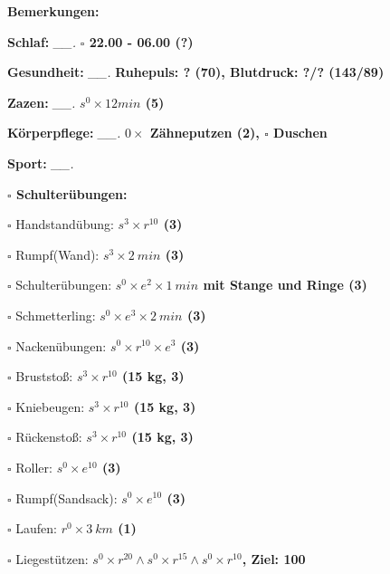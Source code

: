 \documentclass[10pt,a4paper]{article}
\newcommand\prop[1] {{\color {alizarin} {\bf #1}}}        %
\newcommand\mand[1] {{\color {burntorange} {\bf #1}}}     %
\newcommand\topspace{\vskip -15pt \hskip 20pt}
\newcommand\n[1] { {\sl #1.} \hskip 5pt }
\begin{document}
\begin{mdframed}[style=daystyle]
  \begin{labeling}{{\mand {Bemerkungen:}}}
    \setlength\itemsep{-3pt}
  \item[{\mand {Schlaf:}}]       \n{\_\_} {\prop {$\square$ 22.00 - 06.00 (?)}}
  \item[{\mand {Gesundheit:}}]   \n{\_\_} {\prop {Ruhepuls: ? (70), Blutdruck: ?/? (143/89)}}
  \item[{\mand {Zazen:}}]        \n{\_\_} {\prop {$s^0 \times 12 min$ (5)}}
  \item[{\mand {Körperpflege:}}] \n{\_\_} {\prop {$0 \times$ Zähneputzen (2), $\square$ Duschen}}
  \item[{\mand {Sport:}}]        \n{\_\_}
    \topspace
    \begin{minipage}{0.75\textwidth}  
      \begin{labeling}{\prop {$\square$ {Schulterübungen:}}} 
        \setlength\itemsep{-3pt}
      \item[$\square$ Handstandübung:]  {\prop {$s^3 \times r^{10}$ (3)}}
      \item[$\square$ Rumpf(Wand):]     {\prop {$s^3 \times 2\ min$ (3)}}
      \item[$\square$ Schulterübungen:] {\prop {$s^0 \times e^2 \times 1\ min$ mit Stange und Ringe (3)}}
      \item[$\square$ Schmetterling:]   {\prop {$s^0 \times e^3 \times 2\ min$ (3)}}
      \item[$\square$ Nackenübungen:]   {\prop {$s^0 \times r^{10} \times e^3$ (3)}}
      \item[$\square$ Bruststoß:]       {\prop {$s^3 \times r^{10}$ (15 kg, 3)}}
      \item[$\square$ Kniebeugen:]      {\prop {$s^3 \times r^{10}$ (15 kg, 3)}}
      \item[$\square$ Rückenstoß:]      {\prop {$s^3 \times r^{10}$ (15 kg, 3)}}
      \item[$\square$ Roller:]          {\prop {$s^0 \times e^{10}$ (3)}}
      \item[$\square$ Rumpf(Sandsack):] {\prop {$s^0 \times e^{10}$ (3)}}
      \item[$\square$ Laufen:]          {\prop {$r^0 \times 3\ km$ (1)}}
      \item[$\square$ Liegestützen:]    {\prop {$s^0 \times r^{20} \land s^0 \times r^{15} \land s^0 \times r^{10}$, Ziel: 100}}
      \end{labeling}
    \end{minipage}

\end{labeling}
\end{mdframed}
\end{document}
